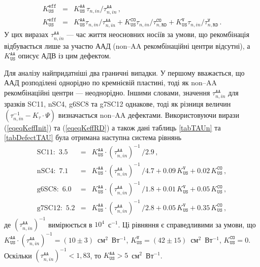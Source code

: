 \begin{eqnarray}
K_\mathtt{US}^\mathtt{eff}&=&K_\mathtt{US}^\mathtt{AA}\,\tau_{n,in}/\tau_{n,in}^\mathtt{AA}\,,\label{eqeqKeffInit}\\
K_\mathtt{US}^\mathtt{eff}&=&K_\mathtt{US}^\mathtt{AA}\tau_{n,in}/\tau_{n,in}^\mathtt{AA}+
                           K_\mathtt{US}^\mathtt{CO}\tau_{n,in}/\tau_{n,\mathtt{RD}}^\mathtt{CO}+
                           K_\mathtt{US}^\mathtt{V}\tau_{n,in}/\tau_{n,\mathtt{RD}}^\mathtt{V} \,.\label{eqeqKeffRD}
\end{eqnarray}
У цих виразах $\tau_{n,in}^\mathtt{AA}$ --- час життя неосновних носіїв за умови, що рекомбінація
відбувається лише за участю ААД (non--AA рекомбінаційні центри відсутні),
а $K_\mathtt{US}^\mathtt{AA}$ описує АДВ із цим дефектом.

Для аналізу найпридатніші два граничні випадки.
У першому вважається,
що ААД розподілені однорідно по кремнієвій пластині, тоді як
non--AA рекомбінаційні центри --- неоднорідно.
Іншими словами,
значення $\tau_{n,in}^\mathtt{AA}$ для зразків SC11, nSC4, g6SC8 та g7SC12
однакове, тоді як різниця величин
$(\tau_{n,in}^{-1}-K_\tau\cdot\Psi)$ визначається non--AA дефектами.
Використовуючи вирази (\ref{eqeqKeffInit}) та (\ref{eqeqKeffRD}) а також
дані таблиць \ref{tabTAUn} та \ref{tabDefectTAU}
була отримана наступна система рівнянь
\begin{eqnarray}
\mbox{SC11}:\,\,3.5&=&K_\mathtt{US}^\mathtt{AA}\cdot(\tau_{n,in}^\mathtt{AA})^{-1}\,/2.9\,,\nonumber\\
\mbox{nSC4}:\,\,7.1&=&K_\mathtt{US}^\mathtt{AA}\cdot(\tau_{n,in}^\mathtt{AA})^{-1}\,/4.7+0.09\,K_\mathtt{US}^\mathtt{V}+0.02\,K_\mathtt{US}^\mathtt{CO}\,,\nonumber\\
\mbox{g6SC8}:\,\,6.0&=&K_\mathtt{US}^\mathtt{AA}\cdot(\tau_{n,in}^\mathtt{AA})^{-1}\,/1.8+0.01\,K_\mathtt{US}^\mathtt{V}+0.05\,K_\mathtt{US}^\mathtt{CO}\,,\nonumber\\
\mbox{g7SC12}:\,\,5.2&=&K_\mathtt{US}^\mathtt{AA}\cdot(\tau_{n,in}^\mathtt{AA})^{-1}\,/2.8+0.05\,K_\mathtt{US}^\mathtt{V}+0.35\,K_\mathtt{US}^\mathtt{CO}\,,\nonumber
\end{eqnarray}
де
$(\tau_{n,in}^\mathtt{AA})^{-1}$ вимірюється в $10^4$~с$^{-1}$.
Ці рівняння є справедливими за умови, що
$K_\mathtt{US}^\mathtt{AA}\cdot(\tau_{n,in}^\mathtt{AA})^{-1}=(10\pm3)$~см$^2$~Вт$^{-1}$,
$K_\mathtt{US}^\mathtt{V}=(42\pm15)$~см$^2$~Вт$^{-1}$,
$K_\mathtt{US}^\mathtt{CO}=0$.
Оскільки  $(\tau_{n,in}^\mathtt{AA})^{-1}<1,83$,
то $K_\mathtt{US}^\mathtt{AA}>5$~см$^2$~Вт$^{-1}$.

